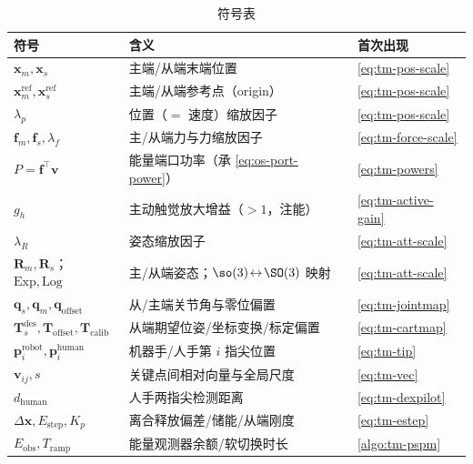 \begin{table}[H]\centering\small
\caption{符号表}
\label{tab:tm-symbols}
\begin{tabular}{lll}
\toprule
符号 & 含义 & 首次出现 \\
\midrule
$\mathbf{x}_m,\mathbf{x}_s$ & 主端/从端末端位置 & \cref{eq:tm-pos-scale} \\
$\mathbf{x}_m^{\text{ref}},\mathbf{x}_s^{\text{ref}}$ & 主端/从端参考点（origin） & \cref{eq:tm-pos-scale} \\
$\lambda_p$ & 位置（$=$ 速度）缩放因子 & \cref{eq:tm-pos-scale} \\
$\mathbf{f}_m,\mathbf{f}_s,\lambda_f$ & 主/从端力与力缩放因子 & \cref{eq:tm-force-scale} \\
$P=\mathbf{f}^\top\mathbf{v}$ & 能量端口功率（承 \cref{eq:os-port-power}） & \cref{eq:tm-powers} \\
$g_h$ & 主动触觉放大增益（$>1$，注能） & \cref{eq:tm-active-gain} \\
$\lambda_R$ & 姿态缩放因子 & \cref{eq:tm-att-scale} \\
$\mathbf{R}_m,\mathbf{R}_s$；$\mathrm{Exp},\mathrm{Log}$ & 主/从端姿态；$\so(3)\!\leftrightarrow\!\SO(3)$ 映射 & \cref{eq:tm-att-scale} \\
$\mathbf{q}_s,\mathbf{q}_m,\mathbf{q}_{\text{offset}}$ & 从/主端关节角与零位偏置 & \cref{eq:tm-jointmap} \\
$\mathbf{T}_s^{\text{des}},\mathbf{T}_{\text{offset}},\mathbf{T}_{\text{calib}}$ & 从端期望位姿/坐标变换/标定偏置 & \cref{eq:tm-cartmap} \\
$\mathbf{p}_i^{\text{robot}},\mathbf{p}_i^{\text{human}}$ & 机器手/人手第 $i$ 指尖位置 & \cref{eq:tm-tip} \\
$\mathbf{v}_{ij},s$ & 关键点间相对向量与全局尺度 & \cref{eq:tm-vec} \\
$d_{\text{human}}$ & 人手两指尖检测距离 & \cref{eq:tm-dexpilot} \\
$\Delta\mathbf{x},E_{\text{step}},K_p$ & 离合释放偏差/储能/从端刚度 & \cref{eq:tm-estep} \\
$E_{\text{obs}},T_{\text{ramp}}$ & 能量观测器余额/软切换时长 & \cref{algo:tm-pspm} \\
\bottomrule
\end{tabular}
\end{table}

